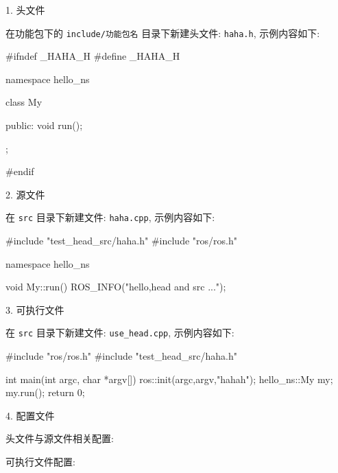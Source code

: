 \documentclass[openany, fontset=windowsold]{ctexbook}
\theoremstyle{kaiti}
\theoremstyle{normal}
\begin{document}
1. 头文件

在功能包下的 \verb|include/功能包名| 目录下新建头文件: \verb|haha.h|, 示例内容如下:

\begin{cpp}
  #ifndef _HAHA_H
  #define _HAHA_H

  namespace hello_ns {

  class My {

  public:
      void run();

  };

  }

  #endif
\end{cpp}

2. 源文件

在 \verb|src| 目录下新建文件: \verb|haha.cpp|, 示例内容如下:

\begin{cpp}
  #include "test_head_src/haha.h"
  #include "ros/ros.h"

  namespace hello_ns{

  void My::run(){
      ROS_INFO("hello,head and src ...");
  }

  }
\end{cpp}

3. 可执行文件

在 \verb|src| 目录下新建文件: \verb|use_head.cpp|, 示例内容如下:

\begin{cpp}
  #include "ros/ros.h"
  #include "test_head_src/haha.h"

  int main(int argc, char *argv[])
  {
      ros::init(argc,argv,"hahah");
      hello_ns::My my;
      my.run();
      return 0;
  }
\end{cpp}

4. 配置文件

头文件与源文件相关配置:


可执行文件配置:

\end{document}
